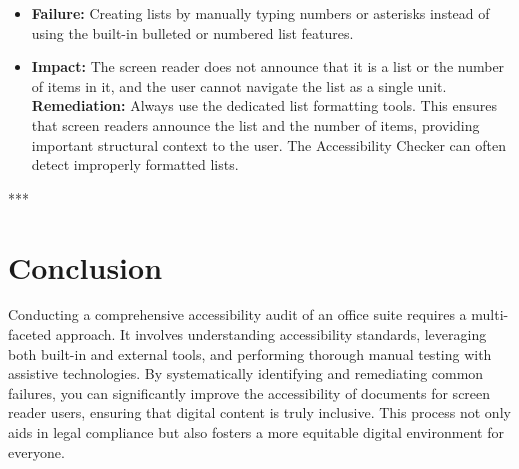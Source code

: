 \begin{itemize}
	\item \textbf{Failure:} Creating lists by manually typing numbers or asterisks instead of using the built-in bulleted or numbered list features.
	\item \textbf{Impact:} The screen reader does not announce that it is a list or the number of items in it, and the user cannot navigate the list as a single unit.
	      \textbf{Remediation:} Always use the dedicated list formatting tools. This ensures that screen readers announce the list and the number of items, providing important structural context to the user. The Accessibility Checker can often detect improperly formatted lists.
\end{itemize}

***

\section{Conclusion}
\label{sec:conclusion}

Conducting a comprehensive accessibility audit of an office suite requires a multi-faceted approach. It involves understanding accessibility standards, leveraging both built-in and external tools, and performing thorough manual testing with assistive technologies. By systematically identifying and remediating common failures, you can significantly improve the accessibility of documents for screen reader users, ensuring that digital content is truly inclusive. This process not only aids in legal compliance but also fosters a more equitable digital environment for everyone.
